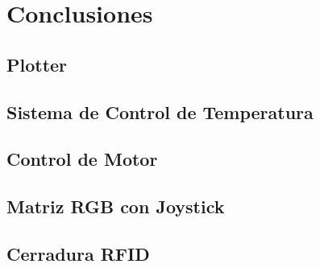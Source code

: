 \section{Conclusiones}
\subsection{Plotter}

\subsection{Sistema de Control de Temperatura}

\subsection{Control de Motor }

\subsection{Matriz RGB con Joystick}

\subsection{Cerradura RFID}
